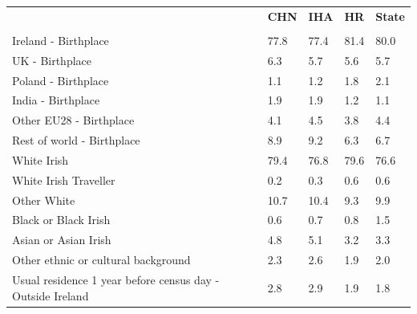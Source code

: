 \documentclass{article}
\begin{document}
\pagebreak
\begin{table}[h]	
\centering
		\begin{tabular}{KTTTT}
  \hline
& \textbf{CHN} & \textbf{IHA} & \textbf{HR}& \textbf{State}\\ 
  \hline
    \\ 
    \hline
Ireland - Birthplace & 77.8& 77.4& 81.4& 80.0\\
UK - Birthplace & 6.3& 5.7& 5.6& 5.7\\
Poland - Birthplace & 1.1& 1.2& 1.8& 2.1\\
India - Birthplace & 1.9& 1.9& 1.2& 1.1\\
Other EU28 - Birthplace & 4.1& 4.5& 3.8& 4.4\\
Rest of world - Birthplace & 8.9& 9.2& 6.3& 6.7\\
    \hline
White Irish & 79.4& 76.8& 79.6& 76.6\\
White Irish Traveller & 0.2& 0.3& 0.6& 0.6\\
Other White & 10.7& 10.4&  9.3&  9.9\\
Black or Black Irish & 0.6& 0.7& 0.8& 1.5\\
Asian or Asian Irish & 4.8& 5.1& 3.2& 3.3\\
Other ethnic or cultural background & 2.3& 2.6& 1.9& 2.0\\
    \hline
Usual residence 1 year before census day - Outside Ireland & 2.8& 2.9& 1.9& 1.8\\


\end{tabular}
\end{table}
\end{document}
